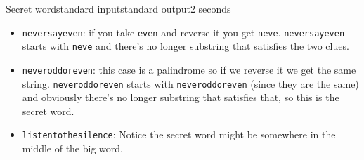 \begin{problem}{Secret word}{standard input}{standard output}{2 seconds}
\begin{itemize}
  \item{\texttt{neversayeven}: if you take \texttt{even} and reverse it you get \texttt{neve}. \texttt{neversayeven} starts with \texttt{neve} and there's no longer substring that satisfies the two clues.}
  
  \item{\texttt{neveroddoreven}: this case is a palindrome so if we reverse it we get the same string. \texttt{neveroddoreven} starts with \texttt{neveroddoreven} (since they are the same) and obviously there's no longer substring that satisfies that, so this is the secret word.}
  
  \item{\texttt{listentothesilence}: Notice the secret word might be somewhere in the middle of the big word.}
\end{itemize}


\end{problem}
